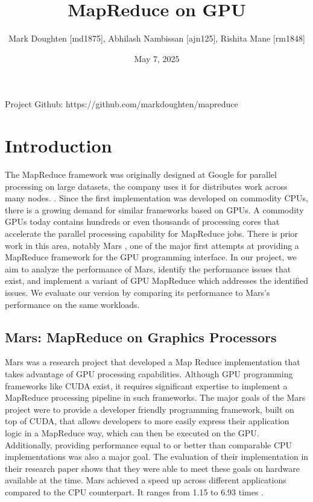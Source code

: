 \documentclass{article}
\title{MapReduce on GPU}
\author{Mark Doughten [md1875], Abhilash Nambissan [ajn125], Rishita Mane [rm1848]}
\date{May 7, 2025}
\begin{document}
\maketitle

Project Github: https://github.com/markdoughten/mapreduce

\section{Introduction}
The MapReduce framework was originally designed at Google for parallel processing on large datasets, the company uses it for distributes work across many nodes. \cite{mapreduce}. Since the first implementation was developed on commodity CPUs, there is a growing demand for similar frameworks based on GPUs. A commodity GPUs today contains hundreds or even thousands of processing cores that accelerate the parallel processing capability for MapReduce jobs. There is prior work in this area, notably Mars \cite{mars}, one of the major first attempts at providing a MapReduce framework for the GPU programming interface. In our project, we aim to analyze the performance of Mars, identify the performance issues that exist, and implement a variant of GPU MapReduce which addresses the identified issues. We evaluate our version by comparing its performance to Mars's performance on the same workloads.

\subsection{Mars: MapReduce on Graphics Processors}
Mars was a research project that developed a Map Reduce implementation that takes advantage of GPU processing capabilities. Although GPU programming frameworks like CUDA \cite{cuda_docs} exist, it requires significant expertise to implement a MapReduce processing pipeline in such frameworks. The major goals of the Mars project were to provide a developer friendly programming framework, built on top of CUDA, that allows developers to more easily express their application logic in a MapReduce way, which can then be executed on the GPU. Additionally, providing performance equal to or better than comparable CPU implementations was also a major goal. The evaluation of their implementation in their research paper shows that they were able to meet these goals on hardware available at the time. Mars achieved a speed up across different applications compared to the CPU counterpart. It ranges from 1.15 to 6.93 times \cite{mars}.
\end{document}
